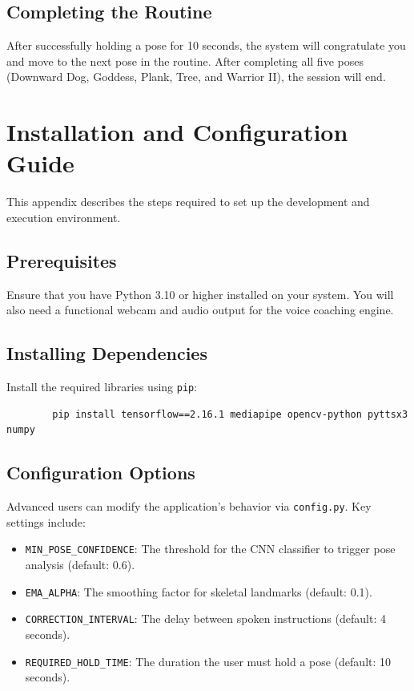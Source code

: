 \documentclass[a4paper, 11pt, oneside]{report}
\begin{document}
        \section{Completing the Routine}
        After successfully holding a pose for 10 seconds, the system will congratulate you and move to the next pose in the routine. After completing all five poses (Downward Dog, Goddess, Plank, Tree, and Warrior II), the session will end.

        \chapter{Installation and Configuration Guide}
        This appendix describes the steps required to set up the development and execution environment.

        \section{Prerequisites}
        Ensure that you have Python 3.10 or higher installed on your system. You will also need a functional webcam and audio output for the voice coaching engine.

        \section{Installing Dependencies}
        Install the required libraries using \texttt{pip}:
        \begin{verbatim}
        pip install tensorflow==2.16.1 mediapipe opencv-python pyttsx3 numpy
        \end{verbatim}

        \section{Configuration Options}
        Advanced users can modify the application's behavior via \texttt{config.py}. Key settings include:
        \begin{itemize}
            \item \texttt{MIN\_POSE\_CONFIDENCE}: The threshold for the CNN classifier to trigger pose analysis (default: 0.6).
            \item \texttt{EMA\_ALPHA}: The smoothing factor for skeletal landmarks (default: 0.1).
            \item \texttt{CORRECTION\_INTERVAL}: The delay between spoken instructions (default: 4 seconds).
            \item \texttt{REQUIRED\_HOLD\_TIME}: The duration the user must hold a pose (default: 10 seconds).
        \end{itemize}
\end{document}
